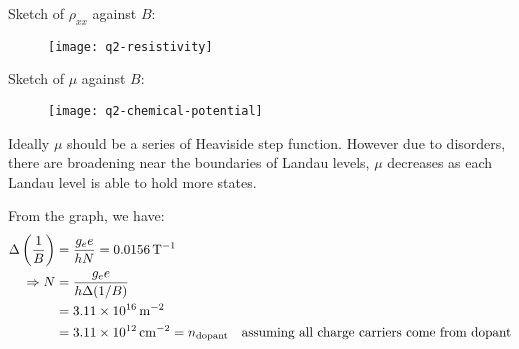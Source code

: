 \begin{parts}
\begin{subparts}
		Sketch of $\rho_{xx}$ against $B$:
		\begin{figure}[H]
			\centering
			\texttt{[image: q2-resistivity]}
		\end{figure}
		
		\newpage
		\subpart Sketch of $\mu$ against $B$:
		\begin{figure}[H]
			\centering
			\texttt{[image: q2-chemical-potential]}
		\end{figure}
		
		Ideally $\mu$ should be a series of Heaviside step function.
		However due to disorders, there are broadening near the boundaries of Landau levels, $\mu$ decreases as each Landau level is able to hold more states.
		
		\subpart From the graph, we have:
		\begin{align*}
			\Delta\left(\frac{1}{B}\right) &= \frac{g_e e}{hN} = \SI{0.0156}{\per\tesla} \\
			\Rightarrow N &= \frac{g_e e}{h \Delta(1/B)} \\
			&= \SI{3.11e16}{\per\metre\squared} \\
			&= \SI{3.11e12}{\per\centi\metre\squared} = n_\textnormal{dopant} \textnormal{\hspace{1em}assuming all charge carriers come from dopant}
		\end{align*}
	\end{subparts}
\end{parts}